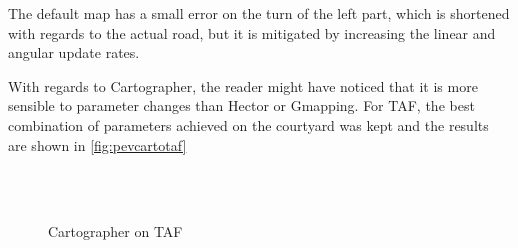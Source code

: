 \clearpage
The default map has a small error on the turn of the left part, which is shortened with regards to the actual road, but it is mitigated by increasing the linear and angular update rates.

 With regards to Cartographer, the reader might have noticed that it is more sensible to parameter changes than Hector or Gmapping. For TAF, the best combination of parameters achieved on the courtyard was kept and the results are shown in \autoref{fig:pevcartotaf}

\begin{figure}[h!]
  \centering
   \\  
   \\
  \caption{Cartographer on TAF}
  \label{fig:pevcartotaf}
\end{figure} 

